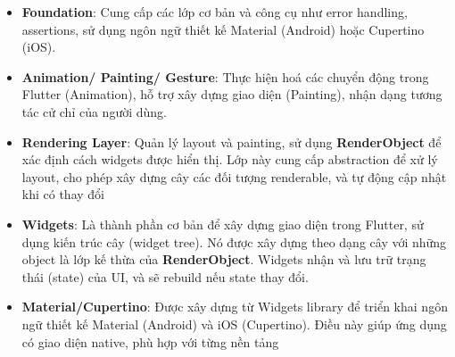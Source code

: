 \documentclass[../DoAn.tex]{subfiles}
\numberwithin{figure}{chapter}
\begin{document}
\begin{itemize}
    \item \textbf{Foundation}: Cung cấp các lớp cơ bản và công cụ như error handling, assertions, sử dụng ngôn ngữ thiết kế Material (Android) hoặc Cupertino (iOS).
    \item \textbf{Animation/ Painting/ Gesture}: Thực hiện hoá các chuyển động trong Flutter (Animation), hỗ trợ xây dựng giao diện (Painting), nhận dạng tương tác cử chỉ của người dùng.
    \item \textbf{Rendering Layer}: Quản lý layout và painting, sử dụng \textbf{RenderObject} để xác định cách widgets được hiển thị. Lớp này cung cấp abstraction để xử lý layout, cho phép xây dựng cây các đối tượng renderable, và tự động cập nhật khi có thay đổi
    \item \textbf{Widgets}: Là thành phần cơ bản để xây dựng giao diện trong Flutter, sử dụng kiến trúc cây (widget tree). Nó được xây dựng theo dạng cây với những object là lớp kế thừa của \textbf{RenderObject}. Widgets nhận và lưu trữ trạng thái (state) của UI, và sẽ rebuild nếu state thay đổi.
    \item \textbf{Material/Cupertino}: Được xây dựng từ Widgets library để triển khai ngôn ngữ thiết kế Material (Android) và iOS (Cupertino). Điều này giúp ứng dụng có giao diện native, phù hợp với từng nền tảng
\end{itemize}
\end{document}

